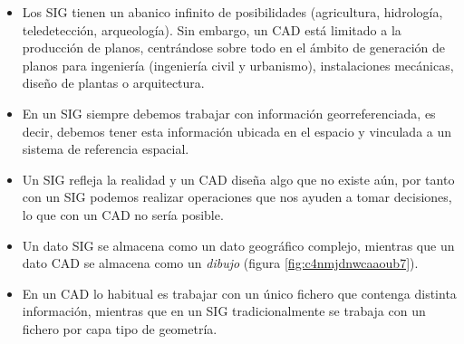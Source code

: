 \begin{itemize}
	
	\item Los SIG tienen un abanico infinito de posibilidades (agricultura, hidrología, teledetección, arqueología). Sin embargo, un CAD está limitado a la producción de planos, centrándose sobre todo en el ámbito de generación de planos para ingeniería (ingeniería civil y urbanismo), instalaciones mecánicas, diseño de plantas o arquitectura.
	
	\item En un SIG siempre debemos trabajar con información georreferenciada, es decir, debemos tener esta información ubicada en el espacio y vinculada a un sistema de referencia espacial.
	
	
	
	\item Un SIG refleja la realidad y un CAD diseña algo que no existe aún, por tanto con un SIG podemos realizar operaciones que nos ayuden a tomar decisiones, lo que con un CAD no sería posible.
	
	\item Un dato SIG se almacena como un dato geográfico complejo, mientras que un dato CAD se almacena como un \textit{dibujo} (figura \ref{fig:c4nmjdnwcaaoub7}).
	
	\item En un CAD lo habitual es trabajar con un único fichero que contenga distinta información, mientras que en un SIG tradicionalmente se trabaja con un fichero por capa tipo de geometría.
	
\end{itemize}



